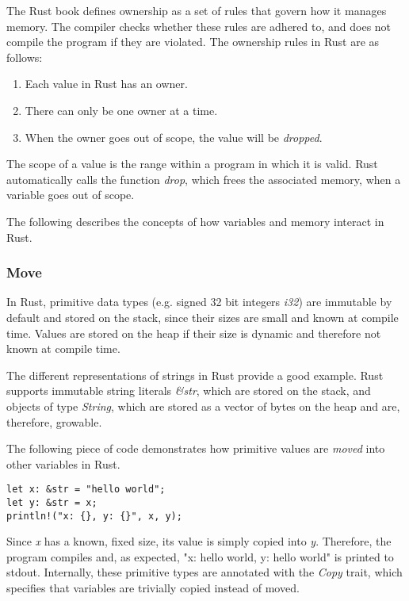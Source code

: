 \documentclass[sigplan,11pt,nonacm]{acmart}
\begin{document}
The Rust book \cite{rust-book} defines ownership as a set of rules that govern how it manages memory.
The compiler checks whether these rules are adhered to, and does not compile the program if they are violated.
The ownership rules in Rust are as follows:
\begin{enumerate}
  \item Each value in Rust has an owner.
  \item There can only be one owner at a time.
  \item When the owner goes out of scope, the value will be \emph{dropped}.
\end{enumerate}
The scope of a value is the range within a program in which it is valid.
Rust automatically calls the function \emph{drop}, which frees the associated memory, when a variable goes out of scope.

The following describes the concepts of how variables and memory interact in Rust.
\cite{rust-book}

\subsubsection{Move}

In Rust, primitive data types (e.g. signed 32 bit integers \emph{i32}) are immutable by default and stored on the stack, since their sizes are small and known at compile time.
Values are stored on the heap if their size is dynamic and therefore not known at compile time.

The different representations of strings in Rust provide a good example.
Rust supports immutable string literals \emph{\&str}, which are stored on the stack, and objects of type \emph{String}, which are stored as a vector of bytes on the heap and are, therefore, growable. \cite{rust-by-example}

The following piece of code demonstrates how primitive values are \emph{moved} into other variables in Rust.
\begin{lstlisting}
let x: &str = "hello world";
let y: &str = x;
println!("x: {}, y: {}", x, y);
\end{lstlisting}
Since \emph{x} has a known, fixed size, its value is simply copied into \emph{y}.
Therefore, the program compiles and, as expected, "x: hello world, y: hello world" is printed to stdout.
Internally, these primitive types are annotated with the \emph{Copy} trait, which specifies that variables are trivially copied instead of moved.
\end{document}
